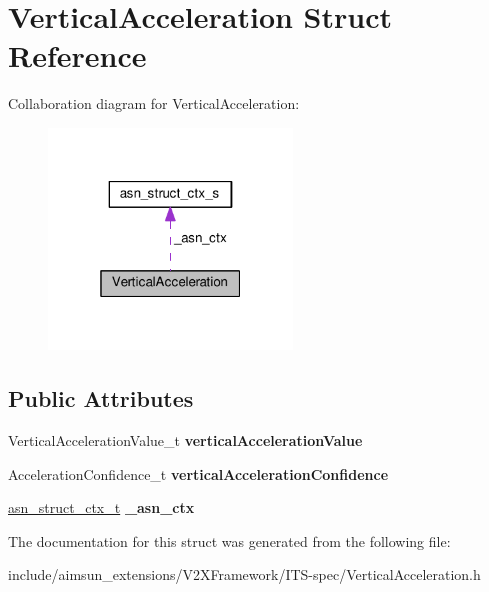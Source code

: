 \hypertarget{structVerticalAcceleration}{}\section{Vertical\+Acceleration Struct Reference}
\label{structVerticalAcceleration}


Collaboration diagram for Vertical\+Acceleration\+:\nopagebreak
\begin{figure}[H]
\begin{center}
\leavevmode
\includegraphics[width=184pt]{structVerticalAcceleration__coll__graph}
\end{center}
\end{figure}
\subsection*{Public Attributes}
\begin{DoxyCompactItemize}
\item 
Vertical\+Acceleration\+Value\+\_\+t {\bfseries vertical\+Acceleration\+Value}\hypertarget{structVerticalAcceleration_aa2891e8997d17114785b4896ab89db1d}{}\label{structVerticalAcceleration_aa2891e8997d17114785b4896ab89db1d}

\item 
Acceleration\+Confidence\+\_\+t {\bfseries vertical\+Acceleration\+Confidence}\hypertarget{structVerticalAcceleration_a03104a6a2a6eea264af0e8ba694e4002}{}\label{structVerticalAcceleration_a03104a6a2a6eea264af0e8ba694e4002}

\item 
\hyperlink{structasn__struct__ctx__s}{asn\+\_\+struct\+\_\+ctx\+\_\+t} {\bfseries \+\_\+asn\+\_\+ctx}\hypertarget{structVerticalAcceleration_a1c532e38f9894f1c55593398eca1fc30}{}\label{structVerticalAcceleration_a1c532e38f9894f1c55593398eca1fc30}

\end{DoxyCompactItemize}


The documentation for this struct was generated from the following file\+:\begin{DoxyCompactItemize}
\item 
include/aimsun\+\_\+extensions/\+V2\+X\+Framework/\+I\+T\+S-\/spec/Vertical\+Acceleration.\+h\end{DoxyCompactItemize}
